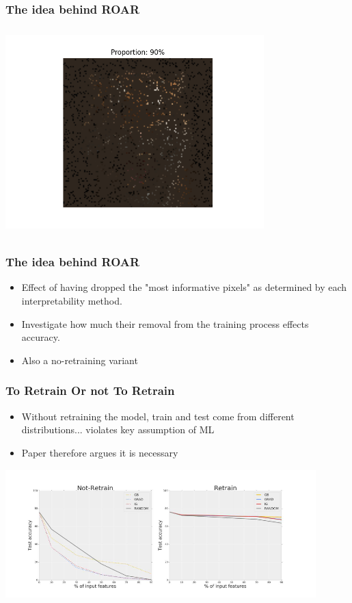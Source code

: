 \documentclass{beamer}
\theoremstyle{mystyle}
\begin{document}
\begin{frame}
	\frametitle{The idea behind ROAR}
	\includegraphics[height=8cm, width=10cm]{tiger0.9.png}

\end{frame}
\begin{frame}
	\frametitle{The idea behind ROAR}
	\begin{itemize}
		\item Effect of having dropped the "most informative pixels" as determined by each interpretability method.
		\item Investigate how much their removal from the training process effects accuracy.		
		\item Also a no-retraining variant
	\end{itemize}
\end{frame}
\begin{frame}
	\frametitle{To Retrain Or not To Retrain}
	\begin{itemize}
	\item Without retraining the model, train and test come from different distributions... violates key assumption of ML \pause
	\item Paper therefore argues it is necessary \pause
	\end{itemize}
	\includegraphics[width=12cm, height=5cm]{retrain_vs_not.png}
\end{frame}
\end{document}
